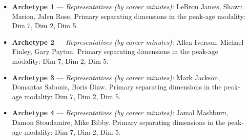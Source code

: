 \begin{itemize}
\item \textbf{Archetype 1} --- \emph{Representatives (by career minutes):} LeBron James, Shawn Marion, Jalen Rose. Primary separating dimensions in the peak-age modality: Dim 7, Dim 2, Dim 5.
\item \textbf{Archetype 2} --- \emph{Representatives (by career minutes):} Allen Iverson, Michael Finley, Gary Payton. Primary separating dimensions in the peak-age modality: Dim 7, Dim 2, Dim 5.
\item \textbf{Archetype 3} --- \emph{Representatives (by career minutes):} Mark Jackson, Domantas Sabonis, Boris Diaw. Primary separating dimensions in the peak-age modality: Dim 7, Dim 2, Dim 5.
\item \textbf{Archetype 4} --- \emph{Representatives (by career minutes):} Jamal Mashburn, Damon Stoudamire, Mike Bibby. Primary separating dimensions in the peak-age modality: Dim 7, Dim 2, Dim 5.
\end{itemize}
